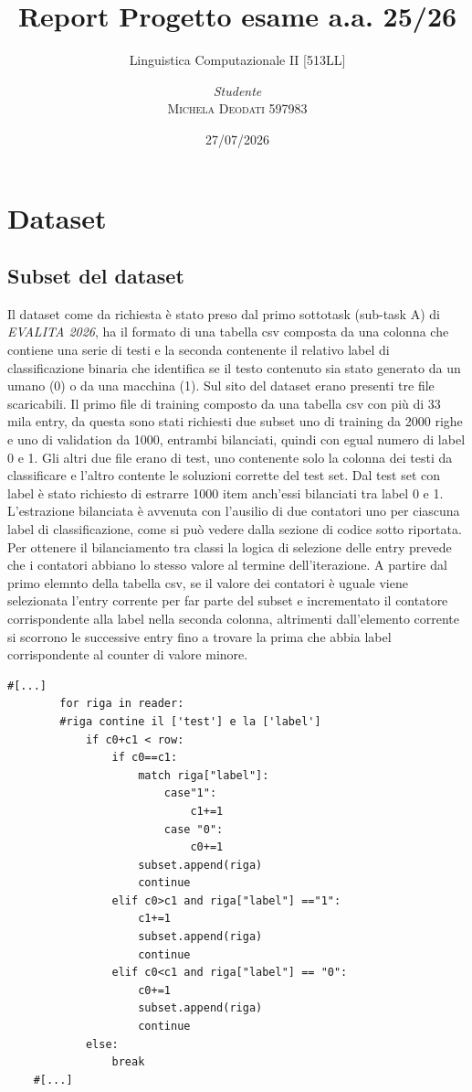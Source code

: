 \documentclass[a4paper,12pt]{report}
\institute{Università di Pisa}
\title{Report Progetto esame a.a. 25/26}
\subtitle{Linguistica Computazionale II [513LL]}
\author{\textit{Studente}\\ \textsc{Michela Deodati 597983}}
\date{27/07/2026}
\begin{document}
    \maketitle

    \clearpage
    \tableofcontents
    \clearpage

    \chapter{Dataset}
    \section{Subset del dataset}
    
    Il dataset come da richiesta è stato preso dal primo sottotask (sub-task A) di \textit{EVALITA 2026}, ha il formato di una tabella csv composta da una colonna che contiene una serie di testi e la seconda contenente il relativo label di classificazione binaria che identifica se il testo contenuto sia stato generato da un umano (0) o da una macchina (1).
    Sul sito del dataset erano presenti tre file scaricabili. Il primo file di training composto da una tabella csv con più di 33 mila entry, da questa sono stati richiesti due subset uno di training da 2000 righe e uno di validation da 1000, entrambi bilanciati, quindi con egual numero di label 0 e 1. Gli altri due file erano di test, uno contenente solo la colonna dei testi da classificare e l'altro contente le soluzioni corrette del test set. Dal test set con label è stato richiesto di estrarre 1000 item anch'essi bilanciati tra label 0 e 1.
    L'estrazione bilanciata è avvenuta con l'ausilio di due contatori uno per ciascuna label di classificazione, come si può vedere dalla sezione di codice sotto riportata. Per ottenere il bilanciamento tra classi la logica di selezione delle entry prevede che i contatori abbiano lo stesso valore al termine dell'iterazione. A partire dal primo elemnto della tabella csv, se il valore dei contatori è uguale viene selezionata l'entry corrente per far parte del subset e incrementato il contatore corrispondente alla label nella seconda colonna, altrimenti dall'elemento corrente si scorrono le successive entry fino a trovare la prima che abbia label corrispondente al counter di valore minore.
    \begin{lstlisting}[style=rulednumbered, language=python*, gobble=4]
    #[...]
        for riga in reader:
        #riga contine il ['test'] e la ['label']
            if c0+c1 < row:
                if c0==c1: 
                    match riga["label"]: 
                        case"1":
                            c1+=1
                        case "0":
                            c0+=1
                    subset.append(riga)
                    continue
                elif c0>c1 and riga["label"] =="1":
                    c1+=1
                    subset.append(riga)
                    continue
                elif c0<c1 and riga["label"] == "0":
                    c0+=1
                    subset.append(riga)
                    continue
            else:
                break
    #[...]
    \end{lstlisting}
\end{document}
